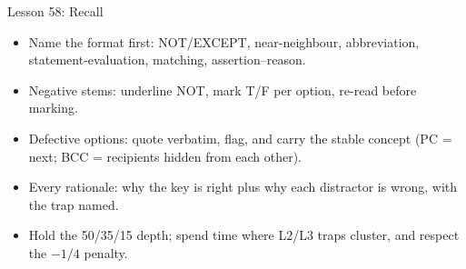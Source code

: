 \documentclass[aspectratio=169]{beamer}
\begin{document}
\begin{frame}{Lesson 58: Recall}
  \begin{itemize}
    \item Name the format first: NOT/EXCEPT, near-neighbour, abbreviation,
      statement-evaluation, matching, assertion--reason.
    \item Negative stems: underline NOT, mark T/F per option, re-read before
      marking.
    \item Defective options: quote verbatim, flag, and carry the stable
      concept (PC = next; BCC = recipients hidden from each other).
    \item Every rationale: why the key is right plus why each distractor is
      wrong, with the trap named.
    \item Hold the 50/35/15 depth; spend time where L2/L3 traps cluster, and
      respect the $-1/4$ penalty.
  \end{itemize}
\end{frame}
\end{document}
